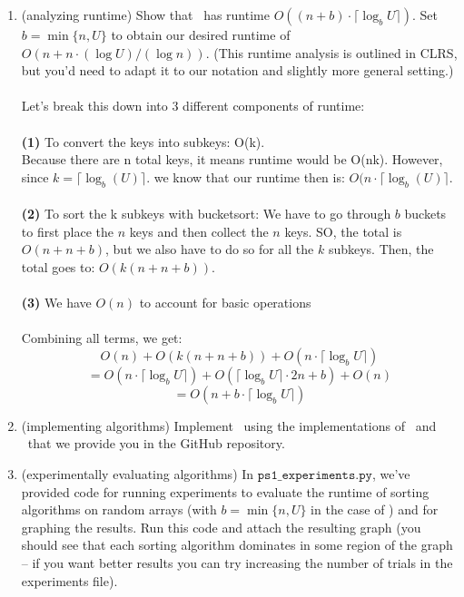 \documentclass[11pt]{article}
\begin{document}
\begin{enumerate}
\begin{enumerate}
            \item (analyzing runtime) Show that \RadixSort\ has runtime $O((n+b)\cdot \lceil \log_b U\rceil)$.  Set $b=\min\{n,U\}$ to obtain our desired runtime of $O(n+n\cdot (\log U)/(\log n))$.  (This runtime analysis is outlined in CLRS, but you'd need to adapt it to our notation and slightly more general setting.) 
            \\\\
            Let's break this down into 3 different components of runtime:
            \\\\ \textbf{(1)} To convert the keys into subkeys: O(k).
            \\ Because there are n total keys, it means runtime would be O(nk). However, since $k = \lceil \log_b(U) \rceil$. we know that our runtime then is: $O(n \cdot \lceil \log_b(U) \rceil$.
            \\\\ \textbf{(2)} To sort the k subkeys with bucketsort: We have to go through $b$ buckets to first place the $n$ keys and then collect the $n$ keys. SO, the total is $O(n + n + b)$, but we also have to do so for all the $k$ subkeys. Then, the total goes to: $O(k(n + n + b))$.
            \\\\ \textbf{(3)} We have $O(n)$ to account for basic operations
            \\\\ Combining all terms, we get:
            \begin{equation*}
                O(n) + O(k(n + n + b)) + O(n\cdot \lceil \log_b U\rceil)
            \end{equation*}
            \begin{equation*}
                = O(n\cdot\lceil \log_b U\rceil) + O(\lceil \log_b U\rceil \cdot 2n + b) + O(n)
            \end{equation*}
            \begin{equation*}
                = O(n + b \cdot \lceil \log_b U\rceil)
            \end{equation*}
            
            \item (implementing algorithms)
            Implement \RadixSort\ using the implementations of \SingletonBucketSort\ and \BC\ that we provide you in the GitHub repository. 
  
            \item (experimentally evaluating algorithms) \label{part:graphs}
            In $\texttt{ps1\_experiments.py}$, we've provided code for running experiments to evaluate the runtime of sorting algorithms on random arrays (with $b=\min\{n,U\}$ in the case of \RadixSort) and for graphing the results. Run this code and attach the resulting graph (you should see that each sorting algorithm dominates in some region of the graph -- if you want better results you can try increasing the number of trials in the experiments file).
                

\end{enumerate}
\end{enumerate}
\end{document}
